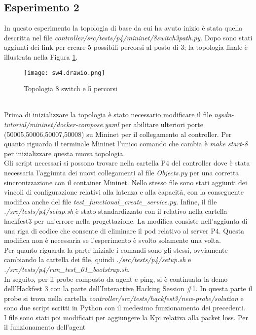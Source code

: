 \subsection{Esperimento 2}
In questo esperimento la topologia di base da cui ha avuto inizio è stata quella descritta nel file \textit{controller/src/tests/p4/mininet/8switch3path.py}.
Dopo sono stati aggiunti dei link per creare 5 possibili percorsi al posto di 3; la topologia finale è illustrata nella Figura \ref{fig:top8}. 
\begin{figure}[h]
    \centering
    \texttt{[image: sw4.drawio.png]}
    \caption{Topologia 8 switch e 5 percorsi}
    \label{fig:top8}
\end{figure}
\\Prima di inizializzare la topologia è stato necessario modificare il file \textit{ngsdn-tutorial/mininet/docker-compose.yaml}
per abilitare ulteriori porte (50005,50006,50007,50008) su Mininet per il collegamento al controller.
Per quanto riguarda il terminale Mininet l'unico comando che cambia è \textit{make start-8} per inizializzare questa nuova topologia.
\\Gli script necessari si possono trovare nella cartella P4 del controller \cite{ofc} dove è stata necessaria l'aggiunta dei nuovi collegamenti al file \textit{Objects.py} per una corretta sincronizzazione con il container Mininet. 
Nello stesso file sono stati aggiunti dei vincoli di configurazione relativi alla latenza e alla capacità, con la conseguente modifica anche del file \textit{test\_functional\_create\_service.py}.
Infine, il file \textit{./src/tests/p4/setup.sh} è stato standardizzato con il relativo nella cartella hackfest3 per un'errore nella progettazione. La modifica 
consiste nell'aggiunta di una riga di codice che consente di eliminare il pod relativo al server P4. Questa modifica non è necessaria se l'esperimento è svolto solamente una volta.
\\Per quanto riguarda la parte iniziale i comandi sono gli stessi, ovviamente cambiando la cartella dei file, quindi \textit{./src/tests/p4/setup.sh} e \textit{./src/tests/p4/run\_test\_01\_bootstrap.sh}.
\\In seguito, per il probe composto da agent e ping, si è continuata la demo dell'Hackfest 3 con la parte dell'Interactive Hacking Session \#1.
In questa parte il probe si trova nella cartella \textit{controller/src/tests/hackfest3/new-probe/solution} e sono due script scritti in Python con il medesimo funzionamento dei precedenti.
\\I file sono stati poi modificati per aggiungere la Kpi relativa alla packet loss. Per il funzionamento dell'agent
